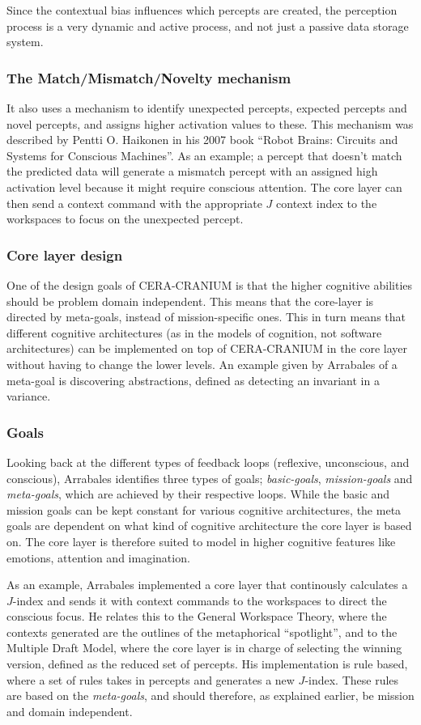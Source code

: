 Since the contextual bias influences which percepts are created, the perception
process is a very dynamic and active process, and not just a passive data
storage system.

\subsubsection{The Match/Mismatch/Novelty mechanism}
It also uses a mechanism to identify unexpected percepts, expected percepts and
novel percepts, and assigns higher activation values to these. This mechanism
was described by Pentti O. Haikonen in his 2007 book ``Robot Brains: Circuits
and Systems for Conscious Machines''\cite{haikonen2007robotbrains}. As an
example; a percept that doesn't match the predicted data will generate a
mismatch percept with an assigned high activation level because it might
require conscious attention. The core layer can then send a context command
with the appropriate $J$ context index to the workspaces to focus on the
unexpected percept.

\subsubsection{Core layer design}
One of the design goals of CERA-CRANIUM is that the higher cognitive abilities
should be problem domain independent.\cite{arrabales2009ceracranium} This means
that the core-layer is directed by meta-goals, instead of mission-specific ones.
This in turn means that different cognitive architectures (as in the models of
cognition, not software architectures) can be implemented on top of CERA-CRANIUM
in the core layer without having to change the lower levels. An example given by
Arrabales of a meta-goal is discovering abstractions, defined as detecting an
invariant in a variance.

\subsubsection{Goals}
Looking back at the different types of feedback loops (reflexive, unconscious,
and conscious), Arrabales identifies three types of goals;
\textit{basic-goals}, \textit{mission-goals} and \textit{meta-goals}, which are
achieved by their respective loops. While the basic and mission goals can be
kept constant for various cognitive architectures, the meta goals are dependent
on what kind of cognitive architecture the core layer is based on. The core
layer is therefore suited to model in higher cognitive features like emotions,
attention and imagination.

As an example, Arrabales implemented a core layer that continously calculates
a $J$-index and sends it with context commands to the workspaces to direct the
conscious focus. He relates this to the General Workspace Theory, where the
contexts generated are the outlines of the metaphorical ``spotlight'', and to
the Multiple Draft Model, where the core layer is in charge of selecting the
winning version, defined as the reduced set of percepts. His implementation is
rule based, where a set of rules takes in percepts and generates a new
$J$-index. These rules are based on the \textit{meta-goals}, and should
therefore, as explained earlier, be mission and domain independent.